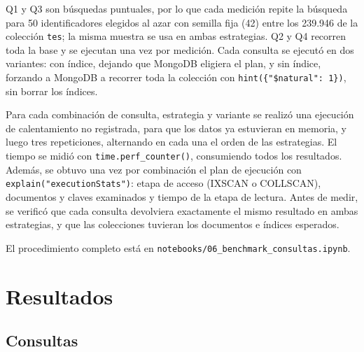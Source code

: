 \documentclass[unnumsec,namedate,webpdf,contemporary,large]{oup-authoring-template}
\begin{document}
Q1 y Q3 son b\'usquedas puntuales, por lo que cada medici\'on repite la b\'usqueda para 50 identificadores elegidos al azar con semilla fija (42) entre los 239.946 de la colecci\'on \texttt{tes}; la misma muestra se usa en ambas estrategias. Q2 y Q4 recorren toda la base y se ejecutan una vez por medici\'on. Cada consulta se ejecut\'o en dos variantes: con \'indice, dejando que MongoDB eligiera el plan, y sin \'indice, forzando a MongoDB a recorrer toda la colecci\'on con \texttt{hint(\{"\$natural": 1\})}, sin borrar los \'indices.

Para cada combinaci\'on de consulta, estrategia y variante se realiz\'o una ejecuci\'on de calentamiento no registrada, para que los datos ya estuvieran en memoria, y luego tres repeticiones, alternando en cada una el orden de las estrategias. El tiempo se midi\'o con \texttt{time.perf\_counter()}, consumiendo todos los resultados. Adem\'as, se obtuvo una vez por combinaci\'on el plan de ejecuci\'on con \texttt{explain("executionStats")}: etapa de acceso (IXSCAN o COLLSCAN), documentos y claves examinados y tiempo de la etapa de lectura. Antes de medir, se verific\'o que cada consulta devolviera exactamente el mismo resultado en ambas estrategias, y que las colecciones tuvieran los documentos e \'indices esperados.

El procedimiento completo est\'a en \texttt{notebooks/06\_benchmark\_consultas.ipynb}.

\section{Resultados}


\subsection{Consultas}
\end{document}
